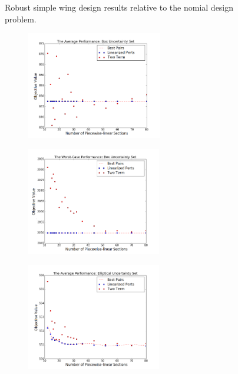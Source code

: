 \begin{figure}[h]
\begin{subfigure}{0.49\textwidth}
    \end{subfigure}
    \caption{Robust simple wing design results relative to the nomial design problem.}
    \label{compare_simple_wing}
\end{figure}

\begin{figure}[H]
    \centering
    \captionsetup{justification=centering, font=small}
    \begin{subfigure}{0.49\textwidth}
        \centering
        \includegraphics[height=1.85in]{simple_wing_results/box_avg_pwl.png}
    \end{subfigure}%
    \begin{subfigure}{0.49\textwidth}
        \centering
        \includegraphics[height=1.85in]{simple_wing_results/box_worst_pwl.png}
    \end{subfigure}
    \begin{subfigure}{0.49\textwidth}
        \centering
        \includegraphics[height=1.85in]{simple_wing_results/ell_avg_pwl.png}

\end{subfigure}
\end{figure}
